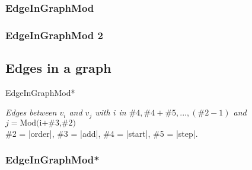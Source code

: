 \subsubsection{EdgeInGraphMod}
\begin{center}
\begin{tkzexample}
\end{tkzexample}
\end{center}

\subsubsection{EdgeInGraphMod 2}
\begin{center}
\begin{tkzexample}
\end{tkzexample}
\end{center}

\newpage
\subsection{Edges in a graph  }
\begin{NewMacroBox}{EdgeInGraphMod*}{}

\medskip
\emph{Edges between $v_i$ and $v_j$ with $i$ in $\#4,\#4+\#5,...,(\text{\#2}-1)$  and $j=\text{Mod(i+\#3,\#2)}$}\\
\#2 = |order|,  \#3 = |add|, \#4 = |start|, \#5 = |step|.\\
\end{NewMacroBox}

\subsubsection{EdgeInGraphMod*}
\begin{center}
\begin{tkzexample}
\end{tkzexample}
\end{center}

